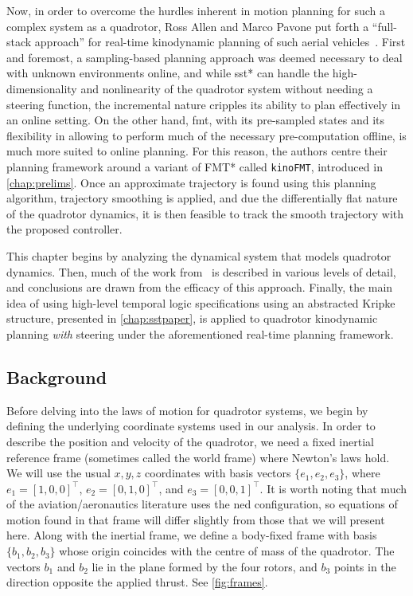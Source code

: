 Now, in order to overcome the hurdles inherent in motion planning for such a complex system as a quadrotor, Ross Allen and Marco Pavone put forth a ``full-stack approach'' for real-time kinodynamic planning of such aerial vehicles~\cite{Allen2016}. First and foremost, a sampling-based planning approach was deemed necessary to deal with unknown environments online, and while \gls{sst}* can handle the high-dimensionality and nonlinearity of the quadrotor system without needing a steering function, the incremental nature cripples its ability to plan effectively in an online setting. On the other hand, \gls{fmt}, with its pre-sampled states and its flexibility in allowing to perform much of the necessary pre-computation offline, is much more suited to online planning. For this reason, the authors centre their planning framework around a variant of FMT* called \texttt{kinoFMT}, introduced in \autoref{chap:prelims}. Once an approximate trajectory is found using this planning algorithm, trajectory smoothing is applied, and due the differentially flat nature of the quadrotor dynamics, it is then feasible to track the smooth trajectory with the proposed controller.

This chapter begins by analyzing the dynamical system that models quadrotor dynamics. Then, much of the work from~\cite{Allen2016} is described in various levels of detail, and conclusions are drawn from the efficacy of this approach. Finally, the main idea of using high-level temporal logic specifications using an abstracted Kripke structure, presented in \autoref{chap:sstpaper}, is applied to quadrotor kinodynamic planning \emph{with} steering under the aforementioned real-time planning framework.





\subsection{Background}

Before delving into the laws of motion for quadrotor systems, we begin by defining the underlying coordinate systems used in our analysis. In order to describe the position and velocity of the quadrotor, we need a fixed inertial reference frame (sometimes called the world frame) where Newton's laws hold. We will use the usual $x,y,z$ coordinates with basis vectors $\{e_1, e_2, e_3 \}$, where ${e_1 = {[1, 0, 0]}^\top}$, ${e_2 = {[0, 1, 0]}^\top}$, and ${e_3 = {[0, 0, 1]}^\top}$. It is worth noting that much of the aviation/aeronautics literature uses the \gls{ned} configuration, so equations of motion found in that frame will differ slightly from those that we will present here. Along with the inertial frame, we define a body-fixed frame with basis $\{b_1, b_2, b_3\}$ whose origin coincides with the centre of mass of the quadrotor. The vectors $b_1$ and $b_2$ lie in the plane formed by the four rotors, and $b_3$ points in the direction opposite the applied thrust. See \autoref{fig:frames}.

